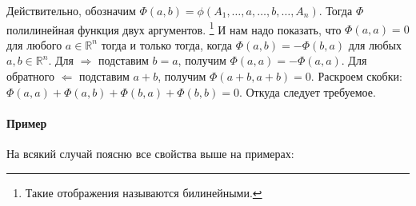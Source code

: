 Действительно, обозначим $\Phi(a,b) = \phi(A_1,\ldots, a, \ldots, b, \ldots, A_n)$.
Тогда $\Phi$ полилинейная функция двух аргументов.%
\footnote{Такие отображения называются билинейными.}
И нам надо показать, что $\Phi(a,a) = 0$ для любого $a\in \mathbb R^n$ тогда и только тогда, когда $\Phi(a,b) = -\Phi(b,a)$ для любых $a,b\in\mathbb R^n$.
Для $\Rightarrow$ подставим $b = a$, получим $\Phi(a,a) = -\Phi(a,a)$.
Для обратного $\Leftarrow$ подставим $a+b$, получим $\Phi(a+b, a+b) = 0$.
Раскроем скобки: $\Phi(a,a) + \Phi(a,b) + \Phi(b,a) + \Phi(b,b) = 0$.
Откуда следует требуемое.

\paragraph{Пример}

На всякий случай поясню все свойства выше на примерах:
